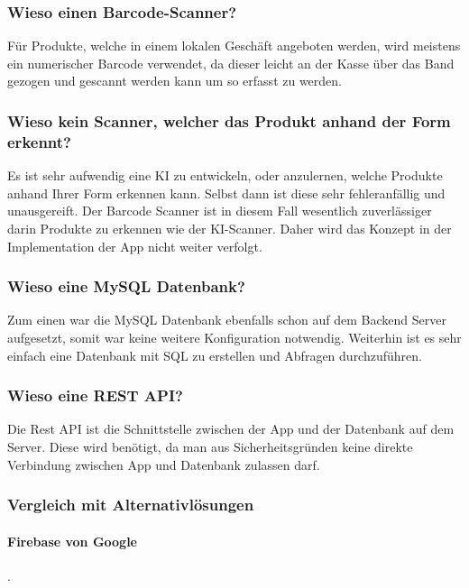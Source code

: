\documentclass{scrartcl}
\begin{document}
\subsubsection{Wieso einen Barcode-Scanner?}

Für Produkte, welche in einem lokalen Geschäft angeboten werden, wird meistens ein numerischer Barcode verwendet, da dieser leicht an der Kasse über das Band gezogen und gescannt werden kann um so erfasst zu werden.

\subsubsection{Wieso kein Scanner, welcher das Produkt anhand der Form erkennt?}

Es ist sehr aufwendig eine KI zu entwickeln, oder anzulernen, welche Produkte anhand Ihrer Form erkennen kann. Selbst dann ist diese sehr fehleranfällig und unausgereift. Der Barcode Scanner ist in diesem Fall wesentlich zuverlässiger darin Produkte zu erkennen wie der KI-Scanner. Daher wird das Konzept in der Implementation der App nicht weiter verfolgt.

\subsubsection{Wieso eine MySQL Datenbank?}

Zum einen war die MySQL Datenbank ebenfalls schon auf dem Backend Server aufgesetzt, somit war keine weitere Konfiguration notwendig. Weiterhin ist es sehr einfach eine Datenbank mit SQL zu erstellen und Abfragen durchzuführen.

\subsubsection{Wieso eine REST API?}

Die Rest API ist die Schnittstelle zwischen der App und der Datenbank auf dem Server. Diese wird benötigt, da man aus Sicherheitsgründen keine direkte Verbindung zwischen App und Datenbank zulassen darf.

\subsubsection{Vergleich mit Alternativlösungen}

\paragraph{Firebase von Google}.\newline
\end{document}
